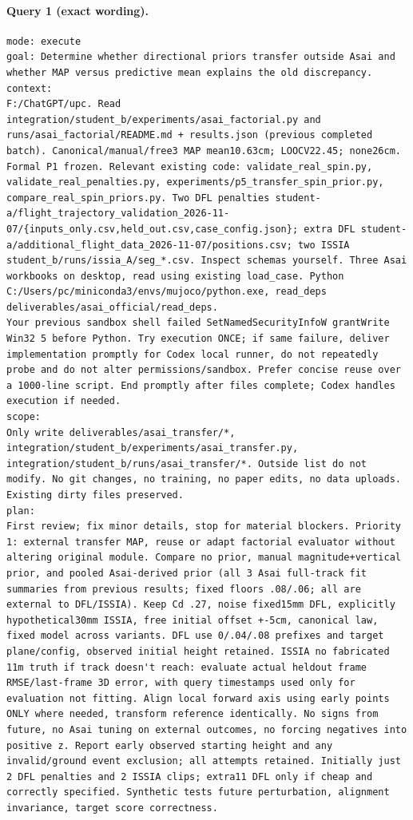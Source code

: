 \documentclass[UTF8,10pt]{ctexart}
\begin{document}
\paragraph{Query 1 (exact wording).}
\begin{Verbatim}[breaklines=true,breakanywhere=true,fontsize=\scriptsize,frame=single,framesep=2pt]
mode: execute
goal: Determine whether directional priors transfer outside Asai and whether MAP versus predictive mean explains the old discrepancy.
context:
F:/ChatGPT/upc. Read integration/student_b/experiments/asai_factorial.py and runs/asai_factorial/README.md + results.json (previous completed batch). Canonical/manual/free3 MAP mean10.63cm; LOOCV22.45; none26cm. Formal P1 frozen. Relevant existing code: validate_real_spin.py, validate_real_penalties.py, experiments/p5_transfer_spin_prior.py, compare_real_spin_priors.py. Two DFL penalties student-a/flight_trajectory_validation_2026-11-07/{inputs_only.csv,held_out.csv,case_config.json}; extra DFL student-a/additional_flight_data_2026-11-07/positions.csv; two ISSIA student_b/runs/issia_A/seg_*.csv. Inspect schemas yourself. Three Asai workbooks on desktop, read using existing load_case. Python C:/Users/pc/miniconda3/envs/mujoco/python.exe, read_deps deliverables/asai_official/read_deps.
Your previous sandbox shell failed SetNamedSecurityInfoW grantWrite Win32 5 before Python. Try execution ONCE; if same failure, deliver implementation promptly for Codex local runner, do not repeatedly probe and do not alter permissions/sandbox. Prefer concise reuse over a 1000-line script. End promptly after files complete; Codex handles execution if needed.
scope:
Only write deliverables/asai_transfer/*, integration/student_b/experiments/asai_transfer.py, integration/student_b/runs/asai_transfer/*. Outside list do not modify. No git changes, no training, no paper edits, no data uploads. Existing dirty files preserved.
plan:
First review; fix minor details, stop for material blockers. Priority 1: external transfer MAP, reuse or adapt factorial evaluator without altering original module. Compare no prior, manual magnitude+vertical prior, and pooled Asai-derived prior (all 3 Asai full-track fit summaries from previous results; fixed floors .08/.06; all are external to DFL/ISSIA). Keep Cd .27, noise fixed15mm DFL, explicitly hypothetical30mm ISSIA, free initial offset +-5cm, canonical law, fixed model across variants. DFL use 0/.04/.08 prefixes and target plane/config, observed initial height retained. ISSIA no fabricated 11m truth if track doesn't reach: evaluate actual heldout frame RMSE/last-frame 3D error, with query timestamps used only for evaluation not fitting. Align local forward axis using early points ONLY where needed, transform reference identically. No signs from future, no Asai tuning on external outcomes, no forcing negatives into positive z. Report early observed starting height and any invalid/ground event exclusion; all attempts retained. Initially just 2 DFL penalties and 2 ISSIA clips; extra11 DFL only if cheap and correctly specified. Synthetic tests future perturbation, alignment invariance, target score correctness.

\end{Verbatim}
\end{document}
